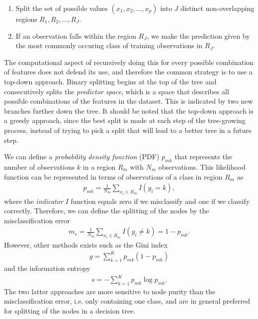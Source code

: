 \begin{enumerate}
  \item Split the set of possible values $(x_1, x_2,...,x_p)$ into $J$ distinct non-overlapping regions $R_1, R_2, ..., R_{J}$.
  \item If an observation falls within the region $R_J$, we make the prediction given by the most commonly occuring class of training observations in $R_{J}$.
\end{enumerate}
The computational aspect of recursively doing this for every possible combination of features does not defend its use, and therefore the common strategy is to use a top-down approach. Binary splitting begins at the top of the tree and consecutively splits the \textit{predictor space}, which is a space that describes all possible combinations of the features in the dataset. This is indicated by two new branches further down the tree. It should be noted that the top-down approach is a greedy approach, since the best split is made at each step of the tree-growing process, instead of trying to pick a split that will lead to a better tree in a future step.

We can define a \textit{probability density function} (PDF) $p_{mk}$ that represents the number of observations $k$ in a region $R_m$ with $N_m$ observations. This likelihood function can be represented in terms of observations of a class in region $R_m$ as
\begin{align}
  p_{mk} = \frac{1}{N_m} \sum_{x_i \in R_m} I(y_i = k),
\end{align}
where the \textit{indicator} $I$ function equals zero if we misclassify and one if we classify correctly. Therefore, we can define the splitting of the nodes by the misclassification error
\begin{align}
  m_{e} = \frac{1}{N_m} \sum_{x_i \in R_m} I(y_i \neq k) = 1 - p_{mk}.
\end{align}
However, other methods exists such as the Gini index
\begin{align}
  g = \sum_{k=1}^{K} p_{mk} (1-p_{mk})
\end{align}
and the information entropy
\begin{align}
  s = - \sum_{k=1}^{K} p_{mk} \log p_{mk}.
\end{align}
The two latter approaches are more sensitive to node purity than the misclassification error, i.e. only containing one class, and are in general preferred \cite{Murphy2012} for splitting of the nodes in a decision tree.

